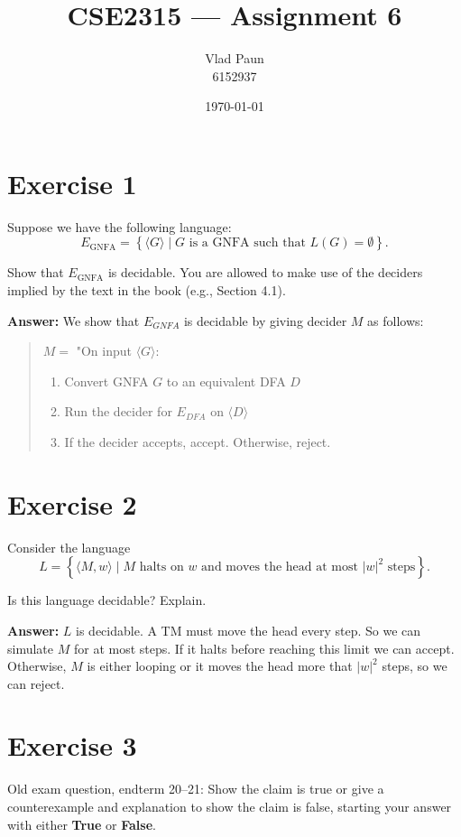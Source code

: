 \documentclass[a4paper,11pt]{article}
\title{\textbf{CSE2315 --- Assignment 6}}
\author{Vlad Paun \\ 6152937}
\date{\today}
\newcommand{\set}[1]{\left\{ #1 \right\}}
\begin{document}
	\maketitle

	\section{Exercise 1}
	Suppose we have the following language:
	\[
	E_{\mathrm{GNFA}} = \set{\langle G \rangle \mid G \text{ is a GNFA such that } L(G)=\emptyset }.
	\]

	Show that $E_{\mathrm{GNFA}}$ is decidable. You are allowed to make use of the deciders implied by the text in the book (e.g., Section 4.1).

	\textbf{Answer: }We show that $E_{GNFA}$ is decidable by giving decider $M$ as follows:
	\begin{quote}
		$M=$ "On input $\langle G\rangle$:
		\begin{enumerate}
			\item Convert GNFA $G$ to an equivalent DFA $D$
			\item Run the decider for $E_{DFA}$ on $\langle D\rangle$
			\item If the decider accepts, accept. Otherwise, reject.
		\end{enumerate}
	\end{quote}

	\section{Exercise 2}
	Consider the language
	\[
	L = \set{\langle M,w \rangle \mid M \text{ halts on } w \text{ and moves the head at most } |w|^2 \text{ steps}}.
	\]

	Is this language decidable? Explain.

	\textbf{Answer: }$L$ is decidable. A TM must move the head every step. So we can simulate $M$ for at most  steps. If it halts before reaching this limit we can accept. Otherwise, $M$ is either looping or it moves the head more that $|w|^2$ steps, so we can reject.

	\section{Exercise 3}
	Old exam question, endterm 20--21: Show the claim is true or give a counterexample and explanation to show the claim is false, starting your answer with either \textbf{True} or \textbf{False}.
\end{document}

